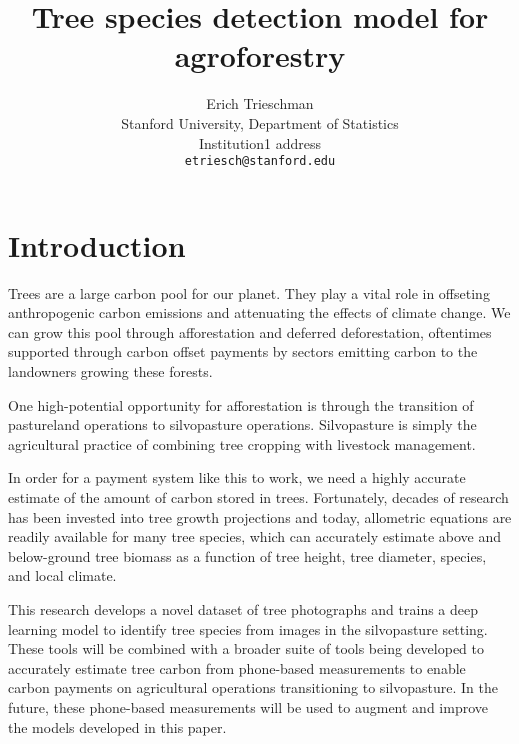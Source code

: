 \documentclass[10pt,twocolumn,letterpaper]{article}
\begin{document}
\title{Tree species detection model for agroforestry}

\author{Erich Trieschman\\
Stanford University, Department of Statistics\\
Institution1 address\\
{\tt\small etriesch@stanford.edu}
}

\maketitle

\section{Introduction}

Trees are a large carbon pool for our planet. They play a vital role in offseting anthropogenic carbon emissions and attenuating the effects of climate change. We can grow this pool through afforestation and deferred deforestation, oftentimes supported through carbon offset payments by sectors emitting carbon to the landowners growing these forests. \cite{Alpher03,Alpher02,Authors14}

One high-potential opportunity for afforestation is through the transition of pastureland operations to silvopasture operations. Silvopasture is simply the agricultural practice of combining tree cropping with livestock management. 

In order for a payment system like this to work, we need a highly accurate estimate of the amount of carbon stored in trees. Fortunately, decades of research has been invested into tree growth projections and today, allometric equations are readily available for many tree species,  which can accurately estimate above and below-ground tree biomass as a function of tree height, tree diameter, species, and local climate. 

This research develops a novel dataset of tree photographs and trains a deep learning model to identify tree species from images in the silvopasture setting. These tools will be combined with a broader suite of tools being developed to accurately estimate tree carbon from phone-based measurements to enable carbon payments on agricultural operations transitioning to silvopasture. In the future, these phone-based measurements will be used to augment and improve the models developed in this paper.
\end{document}
